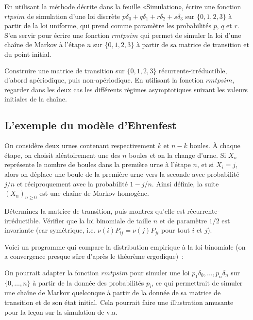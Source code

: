 \begin{exo}
  En utilisant la méthode décrite dans la feuille «Simulation», écrire une
  fonction \ML{} $rtpsim$ de simulation d'une loi discrète
  $p\delta_0+q\delta_1+r\delta_2+s\delta_3$ sur $\{0,1,2,3\}$ à partir de la loi uniforme, qui prend
  comme paramètre les probabilités $p$, $q$ et $r$.  S'en servir pour écrire
  une fonction $rmtpsim$ qui permet de simuler la loi d'une chaîne de Markov à
  l'étape $n$ sur $\{0,1,2,3\}$ à partir de sa matrice de transition et du point
  initial.
\end{exo}

\begin{exo}
  Construire une matrice de transition sur $\{0,1,2,3\}$
  récurrente-irréductible, d'abord apériodique, puis non-apériodique. En
  utilisant la fonction $rmtpsim$, regarder dans les deux cas les différents
  régimes asymptotiques suivant les valeurs initiales de la chaîne.
\end{exo}


%
\subsection{L'exemple du modèle d'Ehrenfest}
%

On considère deux urnes contenant respectivement $k$ et $n-k$ boules. À
chaque étape, on choisit aléatoirement une des $n$ boules et on la change
d'urne. Si $X_n$ représente le nombre de boules dans la première urne à
l'étape $n$, et si $X_i=j$, alors on déplace une boule de la première urne
vers la seconde avec probabilité $j/n$ et réciproquement avec la probabilité
$1-j/n$. Ainsi définie, la suite $(X_n)_{n\geq 0}$ est une chaîne de Markov
homogène. 

Déterminez la matrice de transition, puis montrez qu'elle est
récurrente-irréductible. Vérifier que la loi binomiale de taille $n$ et de
paramètre $1/2$ est invariante (car symétrique, i.e. $\nu(i) P_{ij} = \nu(j)
P_{ji}$ pour tout $i$ et $j$). 
 
Voici un programme \ML{} qui compare la distribution empirique à la loi
binomiale (on a convergence presque sûre d'après le théorème ergodique)~:
%
%
%
\begin{exo}
  On pourrait adapter la fonction $rmtpsim$ pour simuler une loi
  $p_1\delta_0,\ldots,p_n\delta_n$ sur $\{0,\ldots,n\}$ à partir de la donnée
  des probabilités $p_i$, ce qui permettrait de simuler une chaîne de Markov
  quelconque à partir de la donnée de sa matrice de transition et de son état
  initial. Cela pourrait faire une illustration amusante pour la leçon sur la
  simulation de v.a.
\end{exo}

